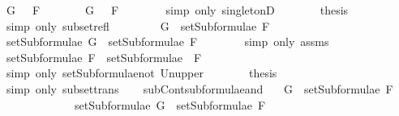 \begin{isabellebody}
\ {\isachardoublequoteopen}G\ {\isasymin}\ {\isacharbraceleft}\isactrlbold {\isasymnot}\ F{\isacharbraceright}{\isachardoublequoteclose}\isanewline
\ \ \ \ \isamarkupfalse%
\ \isamarkupfalse%
\ {\isachardoublequoteopen}G\ {\isacharequal}\ \isactrlbold {\isasymnot}\ F{\isachardoublequoteclose}\isanewline
\ \ \ \ \ \ \isamarkupfalse%
\ {\isacharparenleft}simp\ only{\isacharcolon}\ singletonD{\isacharparenright}\isanewline
\ \ \ \ \isamarkupfalse%
\ \isamarkupfalse%
\ {\isacharquery}thesis\isanewline
\ \ \ \ \ \ \isamarkupfalse%
\ {\isacharparenleft}simp\ only{\isacharcolon}\ subset{\isacharunderscore}refl{\isacharparenright}\isanewline
\ \ \isamarkupfalse%
\isanewline
\ \ \ \ \isamarkupfalse%
\ {\isachardoublequoteopen}G\ {\isasymin}\ setSubformulae\ F{\isachardoublequoteclose}\isanewline
\ \ \ \ \isamarkupfalse%
\ \isamarkupfalse%
\ {}{\isacharcolon}{\isachardoublequoteopen}setSubformulae\ G\ {\isasymsubseteq}\ setSubformulae\ F{\isachardoublequoteclose}\isanewline
\ \ \ \ \ \ \isamarkupfalse%
\ {\isacharparenleft}simp\ only{\isacharcolon}\ assms{\isacharparenleft}{}{\isacharparenright}{\isacharparenright}\isanewline
\ \ \ \ \isamarkupfalse%
\ \isamarkupfalse%
\ {}{\isacharcolon}{\isachardoublequoteopen}setSubformulae\ F\ {\isasymsubseteq}\ setSubformulae\ {\isacharparenleft}\isactrlbold {\isasymnot}\ F{\isacharparenright}{\isachardoublequoteclose}\isanewline
\ \ \ \ \ \ \isamarkupfalse%
\ {\isacharparenleft}simp\ only{\isacharcolon}\ setSubformulae{\isacharunderscore}not\ Un{\isacharunderscore}upper{}{\isacharparenright}\isanewline
\ \ \ \ \isamarkupfalse%
\ \isamarkupfalse%
\ {\isacharquery}thesis\isanewline
\ \ \ \ \ \ \isamarkupfalse%
\ {}\ {}\ \isamarkupfalse%
\ {\isacharparenleft}simp\ only{\isacharcolon}\ subset{\isacharunderscore}trans{\isacharparenright}\isanewline
\ \ \isamarkupfalse%
\isanewline
{}\isamarkupfalse%
%
\endisatagproof
{\isafoldproof}%
%
\isadelimproof
\isanewline
%
\endisadelimproof
\isanewline
{}\isamarkupfalse%
\ subContsubformulae{\isacharunderscore}and{\isacharcolon}\isanewline
\ \ \ {\isachardoublequoteopen}G\ {\isasymin}\ setSubformulae\ F{}\ \isanewline
\ \ \ \ \ \ \ \ \ \ \ \ {\isasymLongrightarrow}\ setSubformulae\ G\ {\isasymsubseteq}\ setSubformulae\ F{}{\isachardoublequoteclose}\isanewline

\end{isabellebody}
